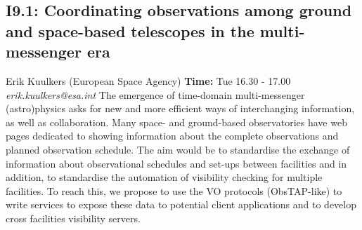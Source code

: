 \documentclass{report}
\begin{document}
\subsection*{I9.1: Coordinating observations among ground and space-based telescopes in the multi-messenger era}
\bigskip
Erik Kuulkers (European Space Agency) \newline   \newline   \newline   \newline  \newline  \newline\newline
{\bf Time:} Tue 16.30 - 17.00\newline
\newline
{\it erik.kuulkers@esa.int}\newline
\newline\newline
The emergence of time-domain multi-messenger (astro)physics asks for new and more efficient ways of interchanging information, as well as collaboration. Many space- and ground-based observatories have web pages dedicated to showing information about the complete observations and planned observation schedule. The aim would be to standardise the exchange of information about observational schedules and set-ups between facilities and in addition, to standardise the automation of visibility checking for multiple facilities. To reach this, we propose to use the VO protocols (ObsTAP-like) to write services to expose these data to potential client applications and to develop cross facilities visibility servers.\newline
\newpage
\end{document}
